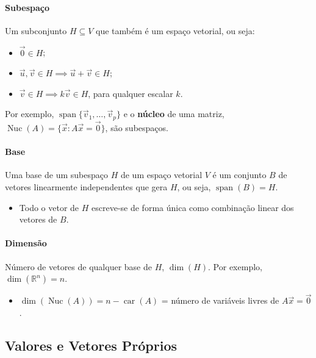 \documentclass{article}
\begin{document}
\paragraph{Subespaço}

Um subconjunto $H \subseteq V$ que também é um espaço vetorial, ou seja:

\begin{itemize}
    \item $\vec{0} \in H$;
    \item $\vec{u}, \vec{v} \in H \implies \vec{u} + \vec{v} \in H$;
    \item $\vec{v} \in H \implies k\vec{v} \in H$, para qualquer escalar $k$.
\end{itemize}

Por exemplo, $\operatorname{span}\{\vec{v}_1, \ldots, \vec{v}_p\}$ e o \textbf{núcleo} de uma matriz,
$\operatorname{Nuc}(A) = \{ \vec{x} : A\vec{x} = \vec{0} \}$, são subespaços.

\paragraph{Base}

Uma base de um subespaço $H$ de um espaço vetorial $V$ é um conjunto $B$ de vetores linearmente independentes
que gera $H$, ou seja, $\operatorname{span}(B) = H$.

\begin{itemize}
    \item Todo o vetor de $H$ escreve-se de forma única como combinação linear dos vetores de $B$.
\end{itemize}

\paragraph{Dimensão}

Número de vetores de qualquer base de $H$, $\dim(H)$. Por exemplo, $\dim(\mathbb{R}^n) = n$.

\begin{itemize}
    \item $\dim(\operatorname{Nuc}(A)) = n - \operatorname{car}(A)$ = número de variáveis livres de
    $A\vec{x} = \vec{0}$.
\end{itemize}

\bigskip

\subsection{Valores e Vetores Próprios}
\label{subsec: valores-vetores-proprios}
\end{document}
